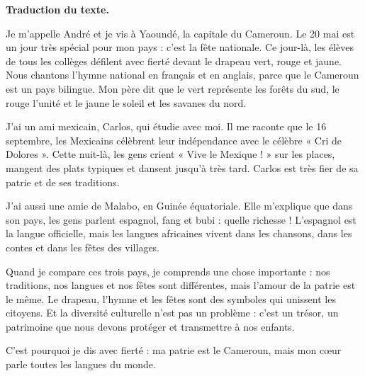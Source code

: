 \documentclass[11pt]{article}
\newcounter{popsec}
\newcounter{popsub}
\newcommand{\courssub}[1]{%
  \stepcounter{popsub}%
  \par\vspace{9pt}\noindent{\popxbold\fontsize{11.5}{13}\selectfont\color{popink}{\color{poporange}\thepopsec.\thepopsub}\hspace{6pt}#1}\par\nopagebreak\vspace{4pt}
}
\begin{document}
\textbf{Traduction du texte.}

Je m'appelle André et je vis à Yaoundé, la capitale du Cameroun. Le 20 mai est un jour très spécial pour mon pays : c'est la fête nationale. Ce jour-là, les élèves de tous les collèges défilent avec fierté devant le drapeau vert, rouge et jaune. Nous chantons l'hymne national en français et en anglais, parce que le Cameroun est un pays bilingue. Mon père dit que le vert représente les forêts du sud, le rouge l'unité et le jaune le soleil et les savanes du nord.

J'ai un ami mexicain, Carlos, qui étudie avec moi. Il me raconte que le 16 septembre, les Mexicains célèbrent leur indépendance avec le célèbre « Cri de Dolores ». Cette nuit-là, les gens crient « Vive le Mexique ! » sur les places, mangent des plats typiques et dansent jusqu'à très tard. Carlos est très fier de sa patrie et de ses traditions.

J'ai aussi une amie de Malabo, en Guinée équatoriale. Elle m'explique que dans son pays, les gens parlent espagnol, fang et bubi : quelle richesse ! L'espagnol est la langue officielle, mais les langues africaines vivent dans les chansons, dans les contes et dans les fêtes des villages.

Quand je compare ces trois pays, je comprends une chose importante : nos traditions, nos langues et nos fêtes sont différentes, mais l'amour de la patrie est le même. Le drapeau, l'hymne et les fêtes sont des symboles qui unissent les citoyens. Et la diversité culturelle n'est pas un problème : c'est un trésor, un patrimoine que nous devons protéger et transmettre à nos enfants.

C'est pourquoi je dis avec fierté : ma patrie est le Cameroun, mais mon cœur parle toutes les langues du monde.

\courssub{Glossaire et lexique du texte}
\end{document}
